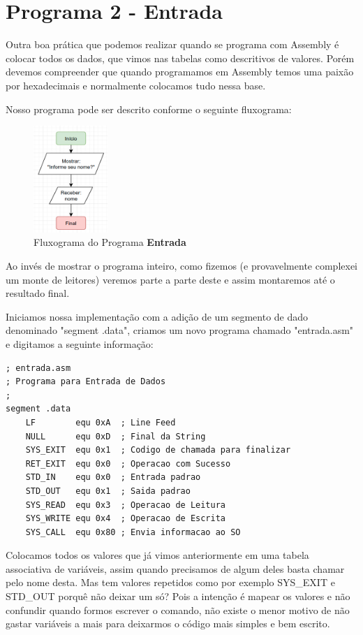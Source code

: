 \section{Programa 2 - Entrada}
Outra boa prática que podemos realizar quando se programa com Assembly é colocar todos os dados, que vimos nas tabelas como descritivos de valores. Porém devemos compreender que quando programamos em Assembly temos uma paixão por hexadecimais e normalmente colocamos tudo nessa base.

Nosso programa pode ser descrito conforme o seguinte fluxograma:
\begin{figure}[H]
	\centering
	\includegraphics[width=0.25\textwidth]{Pictures/cap01/programa2}
	\caption{Fluxograma do Programa \textbf{Entrada}}
\end{figure}

Ao invés de mostrar o programa inteiro, como fizemos (e provavelmente complexei um monte de leitores) veremos parte a parte deste e assim montaremos até o resultado final.

Iniciamos nossa implementação com a adição de um segmento de dado denominado "segment .data", criamos um novo programa chamado "entrada.asm" e digitamos a seguinte informação:
\begin{lstlisting}[]
; entrada.asm	
; Programa para Entrada de Dados
;
segment .data
	LF        equ 0xA  ; Line Feed
	NULL      equ 0xD  ; Final da String
	SYS_EXIT  equ 0x1  ; Codigo de chamada para finalizar
	RET_EXIT  equ 0x0  ; Operacao com Sucesso
	STD_IN    equ 0x0  ; Entrada padrao
	STD_OUT   equ 0x1  ; Saida padrao
	SYS_READ  equ 0x3  ; Operacao de Leitura
	SYS_WRITE equ 0x4  ; Operacao de Escrita
	SYS_CALL  equ 0x80 ; Envia informacao ao SO
\end{lstlisting}

Colocamos todos os valores que já vimos anteriormente em uma tabela associativa de variáveis, assim quando precisamos de algum deles basta chamar pelo nome desta. Mas tem valores repetidos como por exemplo SYS\_EXIT e STD\_OUT porquê não deixar um só? Pois a intenção é mapear os valores e não confundir quando formos escrever o comando, não existe o menor motivo de não gastar variáveis a mais para deixarmos o código mais simples e bem escrito.

